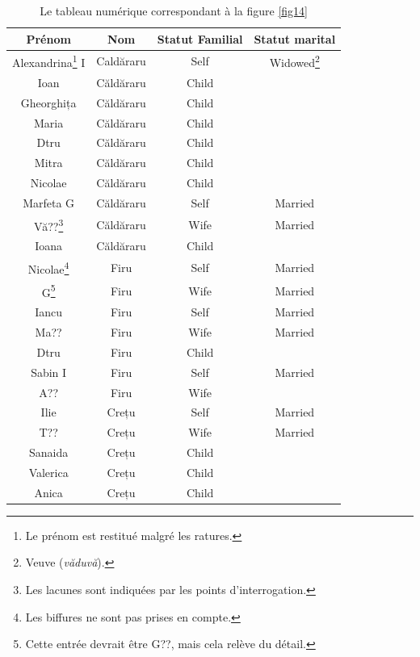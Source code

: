 \documentclass[a4paper,12pt,twoside]{book}
\begin{document}
                \begin{savenotes} %
                \begin{table}[ht]
                \centering
                \renewcommand\cellalign{cl}
                    \begin{tabular}{|c|c|c|c|}
                        \hline
                        Prénom & Nom & Statut Familial & Statut marital\\\hline
                        Alexandrina\footnote{Le prénom est restitué malgré les ratures.} I & Caldăraru & Self & Widowed\footnote{Veuve (\textit{văduvă}).}\\
                        Ioan & Căldăraru & Child & \\
                        Gheorghița & Căldăraru & Child &\\ 
                        Maria & Căldăraru & Child & \\
                        Dtru & Căldăraru & Child & \\
                        Mitra & Căldăraru & Child & \\
                        Nicolae & Căldăraru & Child & \\
                        Marfeta G & Căldăraru & Self & Married\\
                        Vă??\footnote{Les lacunes sont indiquées par les points d'interrogation.} & Căldăraru & Wife & Married\\
                        Ioana & Căldăraru & Child & \\
                        Nicolae\footnote{Les biffures ne sont pas prises en compte.} & Firu & Self & Married\\
                        G\footnote{Cette entrée devrait être \og{}G??\fg{}, mais cela relève du détail.} & Firu & Wife & Married\\
                        Iancu & Firu & Self & Married\\
                        Ma?? & Firu & Wife & Married\\
                        Dtru & Firu & Child & \\
                        Sabin I & Firu & Self & Married\\
                        A?? & Firu & Wife & \\
                        Ilie & Crețu & Self & Married\\
                        T?? & Crețu & Wife & Married\\
                        Sanaida & Crețu & Child & \\
                        Valerica & Crețu & Child & \\
                        Anica & Crețu & Child & \\\hline
                    \end{tabular}
                    \caption{Le tableau numérique correspondant à la figure \ref{fig14}\label{tab10}}
                \end{table}
                \end{savenotes}
                
\end{document}
